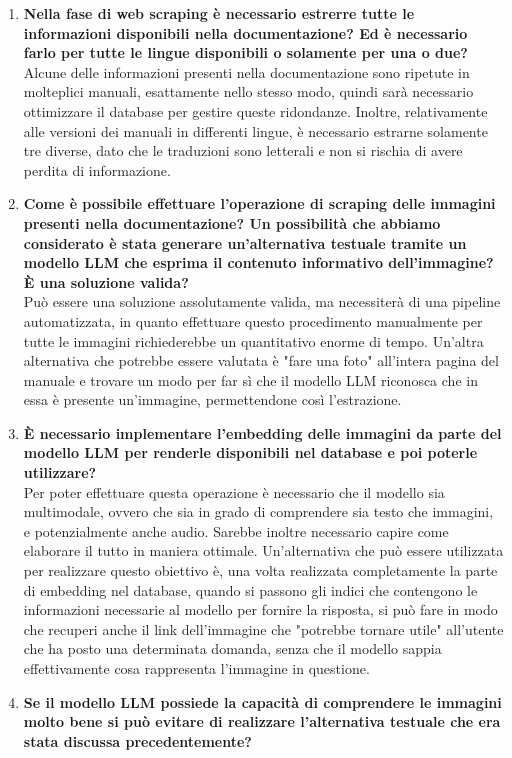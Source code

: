 \begin{enumerate}
\begin{enumerate}[label=\Alph*)]
\begin{itemize}
        \end{itemize}
        \item \textbf{Nella fase di web scraping è necessario estrerre tutte le informazioni disponibili nella documentazione? Ed è necessario farlo per tutte le lingue disponibili o solamente per una o due?}\\
        Alcune delle informazioni presenti nella documentazione sono ripetute in molteplici manuali, esattamente nello stesso modo, quindi sarà necessario ottimizzare il database per gestire queste ridondanze. Inoltre, relativamente alle versioni dei manuali in differenti lingue, è necessario estrarne solamente tre diverse, dato che le traduzioni sono letterali e non si rischia di avere perdita di informazione.
        \item \textbf{Come è possibile effettuare l'operazione di scraping delle immagini presenti nella documentazione? Un possibilità che abbiamo considerato è stata generare un'alternativa testuale tramite un modello LLM che esprima il contenuto informativo dell'immagine? \`E una soluzione valida?}\\
        Può essere una soluzione assolutamente valida, ma necessiterà di una pipeline automatizzata, in quanto effettuare questo procedimento manualmente per tutte le immagini richiederebbe un quantitativo enorme di tempo. Un'altra alternativa che potrebbe essere valutata è "fare una foto" all'intera pagina del manuale e trovare un modo per far sì che il modello LLM riconosca che in essa è presente un'immagine, permettendone così l'estrazione.
        \item \textbf{\`E necessario implementare l'embedding delle immagini da parte del modello LLM per renderle disponibili nel database e poi poterle utilizzare?}\\
        Per poter effettuare questa operazione è necessario che il modello sia multimodale, ovvero che sia in grado di comprendere sia testo che immagini, e potenzialmente anche audio. Sarebbe inoltre necessario capire come elaborare il tutto in maniera ottimale. Un'alternativa che può essere utilizzata per realizzare questo obiettivo è, una volta realizzata completamente la parte di embedding nel database, quando si passono gli indici che contengono le informazioni necessarie al modello per fornire la risposta, si può fare in modo che recuperi anche il link dell'immagine che "potrebbe tornare utile" all'utente che ha posto una determinata domanda, senza che il modello sappia effettivamente cosa rappresenta l'immagine in questione.
        \item \textbf{Se il modello LLM possiede la capacità di comprendere le immagini molto bene si può evitare di realizzare l'alternativa testuale che era stata discussa precedentemente?}\\

\end{enumerate}
\end{enumerate}
